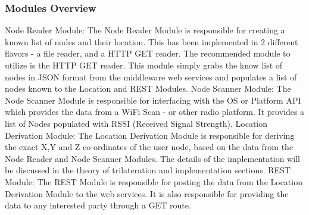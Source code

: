 \documentclass[conference]{IEEEtran}
\begin{document}
\subsubsection{Modules Overview}
Node Reader Module:
\newline
The Node Reader Module is responsible for creating a known list of nodes and their location.  This has been implemented in 2 different flavors - a file reader, and a HTTP GET reader. The recommended module to utilize is the HTTP GET reader. This module simply grabs the know list of nodes in JSON format from the middleware web services and populates a list of nodes known to the Location and REST Modules.
\newline
\newline
Node Scanner Module:
\newline
The Node Scanner Module is responsible for interfacing with the OS or Platform API which provides the data from a WiFi Scan - or other radio platform. It provides a list of Nodes populated with RSSI (Received Signal Strength).
\newline
\newline
Location Derivation Module:
\newline
The Location Derivation Module is responsible for deriving the exact X,Y and Z co-ordinates of the user node, based on the data from the Node Reader and Node Scanner Modules. The details of the implementation will be discussed in the theory of trilateration and implementation sections.
\newline
\newline
REST Module:
\newline
The REST Module is responsible for posting the data from the Location Derivation Module to the web services. It is also responsible for providing the data to any interested party through a GET route.
\newline
\end{document}
